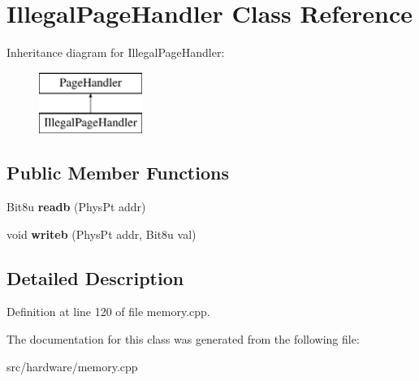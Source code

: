 \hypertarget{classIllegalPageHandler}{\section{Illegal\-Page\-Handler Class Reference}
\label{classIllegalPageHandler}
}
Inheritance diagram for Illegal\-Page\-Handler\-:\begin{figure}[H]
\begin{center}
\leavevmode
\includegraphics[height=2.000000cm]{classIllegalPageHandler}
\end{center}
\end{figure}
\subsection*{Public Member Functions}
\begin{DoxyCompactItemize}
\item 
\hypertarget{classIllegalPageHandler_a4a2a69ab53eed1af39810fe0c83aa130}{Bit8u {\bfseries readb} (Phys\-Pt addr)}\label{classIllegalPageHandler_a4a2a69ab53eed1af39810fe0c83aa130}

\item 
\hypertarget{classIllegalPageHandler_a4c0feeacf35dc15170542bd505524a25}{void {\bfseries writeb} (Phys\-Pt addr, Bit8u val)}\label{classIllegalPageHandler_a4c0feeacf35dc15170542bd505524a25}

\end{DoxyCompactItemize}


\subsection{Detailed Description}


Definition at line 120 of file memory.\-cpp.



The documentation for this class was generated from the following file\-:\begin{DoxyCompactItemize}
\item 
src/hardware/memory.\-cpp\end{DoxyCompactItemize}
